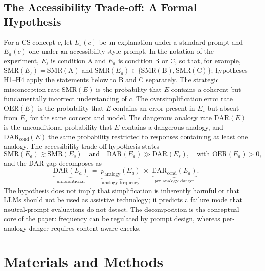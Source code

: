 \documentclass[journal,article,submit,pdftex,moreauthors]{Definitions/mdpi}
\begin{document}
\subsection{The Accessibility Trade-off: A Formal Hypothesis}

For a CS concept $c$, let $E_s(c)$ be an explanation under a standard prompt and $E_a(c)$ one under an accessibility-style prompt. In the notation of the experiment, $E_s$ is condition A and $E_a$ is condition B or C, so that, for example, $\mathrm{SMR}(E_s) = \mathrm{SMR(A)}$ and $\mathrm{SMR}(E_a) \in \{\mathrm{SMR(B)}, \mathrm{SMR(C)}\}$; hypotheses H1--H4 apply the statements below to B and C separately. The strategic misconception rate $\mathrm{SMR}(E)$ is the probability that $E$ contains a coherent but fundamentally incorrect understanding of $c$. The oversimplification error rate $\mathrm{OER}(E)$ is the probability that $E$ contains an error present in $E_a$ but absent from $E_s$ for the same concept and model. The dangerous analogy rate $\mathrm{DAR}(E)$ is the unconditional probability that $E$ contains a dangerous analogy, and $\mathrm{DAR}_{\text{cond}}(E)$ the same probability restricted to responses containing at least one analogy. The accessibility trade-off hypothesis states
\begin{equation}
    \mathrm{SMR}(E_a) \gtrsim \mathrm{SMR}(E_s) \quad \text{and} \quad \mathrm{DAR}(E_a) \gg \mathrm{DAR}(E_s), \quad \text{with } \mathrm{OER}(E_a) > 0,
\end{equation}
and the DAR gap decomposes as
\begin{equation}
    \underbrace{\mathrm{DAR}(E_a)}_{\text{unconditional}} \;=\; \underbrace{p_{\text{analogy}}(E_a)}_{\text{analogy frequency}} \;\times\; \underbrace{\mathrm{DAR}_{\text{cond}}(E_a)}_{\text{per-analogy danger}}.
    \label{eq:dar_decomp}
\end{equation}
The hypothesis does not imply that simplification is inherently harmful or that LLMs should not be used as assistive technology; it predicts a failure mode that neutral-prompt evaluations do not detect. The decomposition is the conceptual core of the paper: frequency can be regulated by prompt design, whereas per-analogy danger requires content-aware checks.

\section{Materials and Methods}
\label{sec:method}
\end{document}
